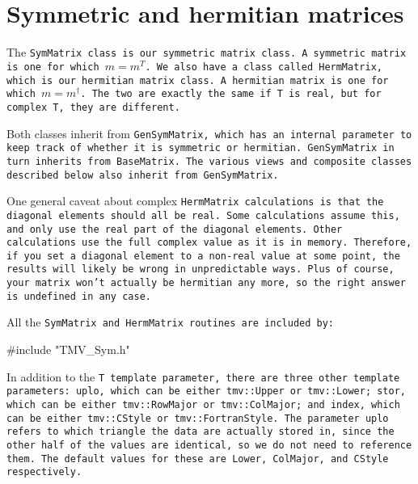 
\section{Symmetric and hermitian matrices}
\label{SymMatrix}

The \tt{SymMatrix} class is our symmetric matrix class.  A symmetric matrix is
one for which $m = m^T$.  We also have a class called
\tt{HermMatrix}, which is our hermitian matrix class.  A hermitian matrix
is one for which $m = m^\dagger$.  The two are exactly the same 
if \tt{T} is real, but for complex \tt{T}, they are different.

Both classes inherit from \tt{GenSymMatrix},
which has an internal parameter to keep track
of whether it is symmetric or hermitian.
\tt{GenSymMatrix} in turn inherits from \tt{BaseMatrix}.  
The various views and composite classes described below 
also inherit from \tt{GenSymMatrix}.

One general caveat about complex \tt{HermMatrix} calculations is that the diagonal
elements should all be real.  Some calculations assume this, and only 
use the real part of the diagonal elements.  Other calculations use the 
full complex value as it is in memory.  Therefore, if you set a diagonal element 
to a non-real value at some point, the results will likely be wrong in
unpredictable ways.  Plus of course, your matrix won't actually be hermitian any more,
so the right answer is undefined in any case.

All the \tt{SymMatrix} and \tt{HermMatrix} routines are included by:
\begin{tmvcode}
#include "TMV_Sym.h"
\end{tmvcode}

In addition to the \tt{T} template parameter, there are three other template 
parameters: \tt{uplo}, which can be either \tt{tmv::Upper} or \tt{tmv::Lower};
\tt{stor}, which can be either \tt{tmv::RowMajor} or \tt{tmv::ColMajor}; and
\tt{index}, which can be either \tt{tmv::CStyle} or \tt{tmv::FortranStyle}.
The parameter \tt{uplo} refers to which triangle the data are actually stored in, 
since the
other half of the values are identical, so we do not need to reference them.
The default values for these are \tt{Lower}, \tt{ColMajor}, and \tt{CStyle}
respectively.

